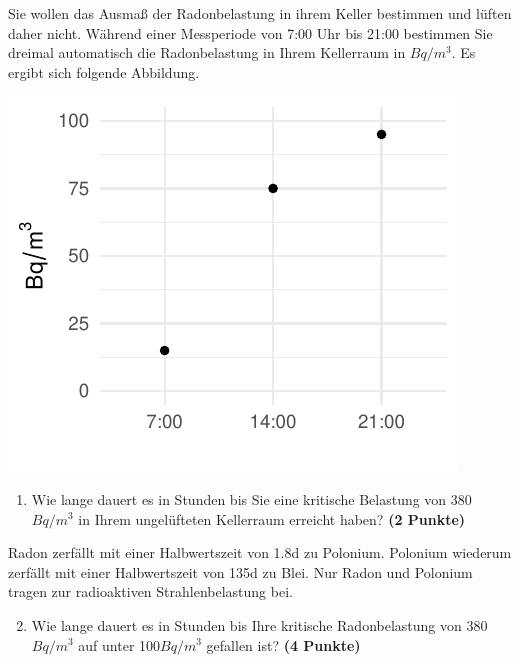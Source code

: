 \documentclass[a4paper, 9pt]{scrartcl}\usepackage[]{graphicx}\usepackage[]{xcolor}
\makeatletter
\def\maxwidth{ %
  \ifdim\Gin@nat@width>\linewidth
    \linewidth
  \else
    \Gin@nat@width
  \fi
}
\newenvironment{knitrout}{}{} %
\makeatother
\begin{document}
Sie wollen das Ausma{\ss} der Radonbelastung in ihrem Keller bestimmen und
l{\"u}ften daher nicht. W{\"a}hrend einer Messperiode von 7:00 Uhr bis
21:00 bestimmen Sie dreimal automatisch die Radonbelastung in
Ihrem Kellerraum in $Bq/m^3$. Es ergibt sich folgende Abbildung.

\begin{knitrout}
\color{fgcolor}

{\centering \includegraphics[width=\maxwidth]{img/math-10-1} 

}


\end{knitrout}

\vspace{-0.75cm}

\begin{enumerate}
\item Wie lange dauert es in Stunden bis Sie eine kritische Belastung von
  380$Bq/m^3$ in Ihrem ungel{\"u}fteten Kellerraum erreicht haben?
  \textbf{(2 Punkte)}
\end{enumerate}

Radon zerf{\"a}llt mit einer Halbwertszeit von 1.8d zu
Polonium. Polonium wiederum zerf{\"a}llt mit einer Halbwertszeit von
135d zu Blei. Nur Radon und Polonium tragen zur
radioaktiven Strahlenbelastung bei.

\begin{enumerate}
  \setcounter{enumi}{1}
\item Wie lange dauert es in Stunden bis Ihre kritische Radonbelastung von
  380$Bq/m^3$ auf unter 100$Bq/m^3$ gefallen ist?
  \textbf{(4 Punkte)}
\end{enumerate}
\end{document}
